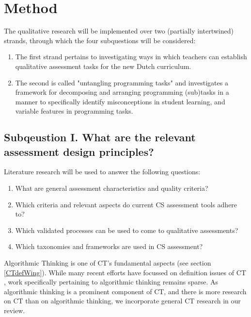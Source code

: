 \section{Method}\label{sec:method}




The qualitative research will be implemented over two (partially intertwined) strands, through which the four subquestions will be considered:
\begin{enumerate}
\item The first strand pertains to investigating ways in which teachers can establish qualitative assessment tasks for the new Dutch curriculum.
\item The second is called "untangling programming tasks" and investigates a framework for decomposing and arranging programming (sub)tasks in a manner to specifically identify misconceptions in student learning, and variable features in programming tasks.
\end{enumerate}




\subsection{Subqeustion I. What are the relevant assessment design principles?}%
Literature research will be used to answer the following questions:

\begin{enumerate}
\item What are general assessment characteristics and quality criteria?
\item Which criteria and relevant aspects do current CS assessment tools adhere to?
\item Which validated processes can be used to come to qualitative assessments?
\item Which taxonomies and frameworks are used in CS assessment?
\end{enumerate}

Algorithmic Thinking is one of CT's fundamental aspects (see section \ref{CTdefWing}). While many recent efforts have focussed on definition issues of CT \cite{GroverPea2013}, work specifically pertaining to algorithmic thinking remains sparse. As algorithmic thinking is a prominent component of CT, and there is more research on CT than on algorithmic thinking, we incorporate general CT research in our review.



